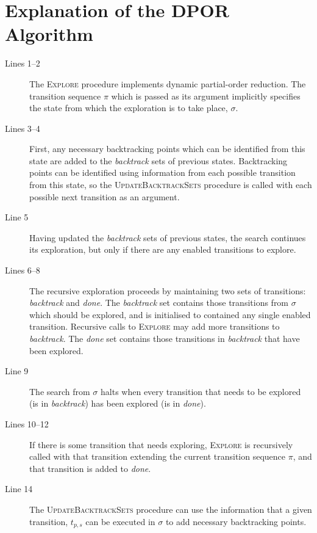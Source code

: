 \documentclass[12pt,a4paper,twoside,openright]{report}
\begin{document}
\chapter{Explanation of the DPOR Algorithm}
\label{app:dpor-walkthrough}
\dporpseudocode
\begin{description}
	\item[Lines 1--2] The \textsc{Explore} procedure implements
	dynamic partial-order reduction. The transition sequence
	$\pi$ which is passed as its argument implicitly specifies the state
	from which the exploration is to take place, $\sigma$.

	\item[Lines 3--4] First, any necessary backtracking points
	which can be identified from this state are added to the
	\textit{backtrack} sets of previous states. Backtracking
	points can be identified using information from each possible
	transition from this state, so the \textsc{UpdateBacktrackSets}
	procedure is called with each possible next transition as an
	argument.

	\item[Line 5] Having updated the \textit{backtrack} sets
	of previous states, the search continues its exploration,
	but only if there are any enabled transitions to explore.

	\item[Lines 6--8] The recursive exploration proceeds by
	maintaining two sets of transitions: \textit{backtrack}
	and \textit{done}. The \textit{backtrack} set contains
	those transitions from $\sigma$ which should be explored,
	and is initialised to contained any single enabled transition.
	Recursive calls to
	\textsc{Explore} may add more transitions to \textit{backtrack}.
	The \textit{done} set contains those transitions
	in \textit{backtrack} that have been explored.

	\item[Line 9] The search from $\sigma$ halts when every
	transition that needs to be explored (is in \textit{backtrack})
	has been explored (is in \textit{done}).

	\item[Lines 10--12] If there is some transition that needs
	exploring, \textsc{Explore} is recursively called with that
	transition extending the current transition sequence $\pi$,
	and that transition is added to \textit{done}.

	\item[Line 14] The \textsc{UpdateBacktrackSets} procedure
	can use the information that a given transition, $t_{p,s}$ can be
	executed in $\sigma$ to add necessary backtracking points.


\end{description}
\end{document}
